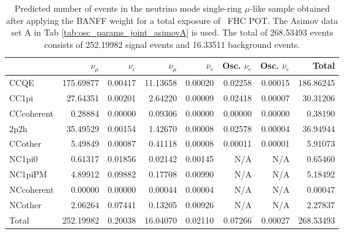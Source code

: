 \begin{table}
	\centering
	\begin{tabular} { | l ||r | r | r | r | r | r | | r | }
	\hline
	              & $\nu_\mu$            & $\nu_e$              & $\bar{\nu}_{\mu}$    & $\bar{\nu}_{e}$      & Osc. $\nu_e$         & Osc. $\bar{\nu}_{e}$ & Total                \\ \hline\hline
	 CCQE         & 175.69877            & 0.00417              & 11.13658             & 0.00020              & 0.02258              & 0.00015              & 186.86245            \\ \hline
	 CC1pi        & 27.64351             & 0.00201              & 2.64220              & 0.00009              & 0.02418              & 0.00007              & 30.31206             \\ \hline
	 CCcoherent   & 0.28884              & 0.00000              & 0.09306              & 0.00000              & 0.00000              & 0.00000              & 0.38190              \\ \hline
	 2p2h         & 35.49529             & 0.00154              & 1.42670              & 0.00008              & 0.02578              & 0.00004              & 36.94944             \\ \hline
	 CCother      & 5.49849              & 0.00087              & 0.41118              & 0.00008              & 0.00011              & 0.00001              & 5.91073              \\ \hline
	 NC1pi0       & 0.61317              & 0.01856              & 0.02142              & 0.00145              & N/A                  & N/A                  & 0.65460              \\ \hline
	 NC1piPM      & 4.89912              & 0.09882              & 0.17708              & 0.00990              & N/A                  & N/A                  & 5.18492              \\ \hline
	 NCcoherent   & 0.00000              & 0.00000              & 0.00044              & 0.00004              & N/A                  & N/A                  & 0.00047              \\ \hline
	 NCother      & 2.06264              & 0.07441              & 0.13205              & 0.00926              & N/A                  & N/A                  & 2.27837              \\ \hline
	\hline
	 Total        & 252.19982            & 0.20038              & 16.04070             & 0.02110              & 0.07266              & 0.00027              & 268.53493            \\ \hline
	\end{tabular}
	\caption{Predicted number of events in the neutrino mode single-ring $\mu$-like sample obtained after applying the BANFF weight for a total exposure of \TotalPotNuRunOneNineC\ FHC POT. The Asimov data set A in Tab \ref{tab:osc_params_joint_asimovA} is used. The total of 268.53493 events consists of 252.19982 signal events and 16.33511 background events.}
	\label{tab:event_rates_exp_1Rmu}
\end{table}

